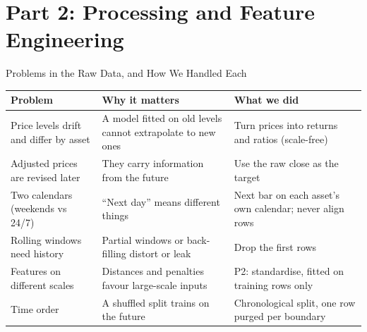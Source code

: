\documentclass[aspectratio=169,11pt]{beamer}
\newcommand{\currentspeaker}{}
\newcommand{\speaker}[1]{\gdef\currentspeaker{#1}}
\newcounter{progresssection}
\newcommand{\progresssection}[1]{\setcounter{progresssection}{#1}}
\newcommand{\repourl}{https://github.com/Steven-ZYC/INT4096-ML-Financial-Forecasting}
\newcommand{\currentrepolink}{}
\newcommand{\repolink}[2]{\gdef\currentrepolink{%
  \href{\repourl/#1/main/#2}{\color{accent}GitHub: \texttt{\detokenize{#2}}}}}
\newcommand{\act}[1]{\section{#1}}
\begin{document}
\act{Part 2: Processing and Feature Engineering}
\progresssection{2}

\begin{frame}{Problems in the Raw Data, and How We Handled Each}
  \repolink{tree}{data/cards}
  \speaker{Zhang Yancheng}
  \centering\footnotesize
  \renewcommand{\arraystretch}{1.22}
  \begin{tabular}{@{}>{\raggedright\arraybackslash}p{.27\linewidth}>{\raggedright\arraybackslash}p{.31\linewidth}>{\raggedright\arraybackslash}p{.355\linewidth}@{}}
    \toprule
    \textbf{Problem} & \textbf{Why it matters} & \textbf{What we did} \\
    \midrule
    Price levels drift and differ by asset & A model fitted on old levels cannot extrapolate to new ones & Turn prices into returns and ratios (scale-free) \\
    Adjusted prices are revised later & They carry information from the future & Use the raw close as the target \\
    Two calendars (weekends vs 24/7) & ``Next day'' means different things & Next bar on each asset's own calendar; never align rows \\
    Rolling windows need history & Partial windows or back-filling distort or leak & Drop the first \Warmup{} rows \\
    Features on different scales & Distances and penalties favour large-scale inputs & P2: standardise, fitted on training rows only \\
    Time order & A shuffled split trains on the future & Chronological split, one row purged per boundary \\
    \bottomrule
  \end{tabular}
\end{frame}
\end{document}
